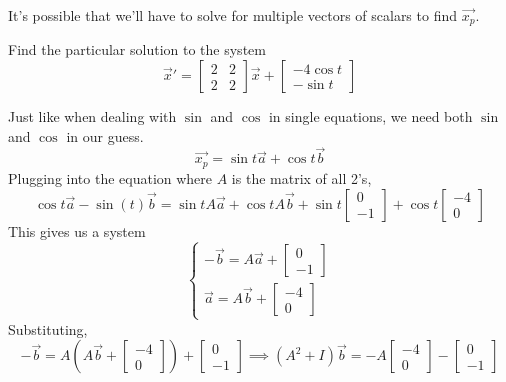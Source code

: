 \noindent
It's possible that we'll have to solve for multiple vectors of scalars to find $\vec{x_p}$.
\begin{example}
	Find the particular solution to the system
	\begin{equation*}
		\vec{x}' = \begin{bmatrix}
			2 & 2 \\
			2 & 2
		\end{bmatrix}\vec{x} + \begin{bmatrix}
			-4\cos{t} \\
			-\sin{t}
		\end{bmatrix}
	\end{equation*}
\end{example}
Just like when dealing with $\sin$ and $\cos$ in single equations, we need both $\sin$ and $\cos$ in our guess.
\begin{equation*}
	\vec{x_p} = \sin{t}\vec{a} + \cos{t}\vec{b}
\end{equation*}
Plugging into the equation where $A$ is the matrix of all 2's,
\begin{equation*}
	\cos{t}\vec{a} - \sin(t)\vec{b} = \sin{t}A\vec{a} + \cos{t}A\vec{b} + \sin{t}\begin{bmatrix}
		0 \\
		-1
	\end{bmatrix} + \cos{t}\begin{bmatrix}
		-4 \\
		0
	\end{bmatrix}
\end{equation*}
This gives us a system
\begin{equation*}
	\begin{cases}
		-\vec{b} = A\vec{a} + \begin{bmatrix}
			0 \\
			-1
		\end{bmatrix} \\
		\vec{a} = A\vec{b} + \begin{bmatrix}
			-4 \\
			0
		\end{bmatrix}
	\end{cases}
\end{equation*}
Substituting,
\begin{equation*}
	-\vec{b} = A\left(A\vec{b} + \begin{bmatrix}
		-4 \\
		0
	\end{bmatrix}\right) + \begin{bmatrix}
		0 \\
		-1
	\end{bmatrix} \implies (A^2 + I)\vec{b} = -A\begin{bmatrix}
		-4 \\
		0
	\end{bmatrix} - \begin{bmatrix}
		0 \\
		-1
	\end{bmatrix}
\end{equation*}

